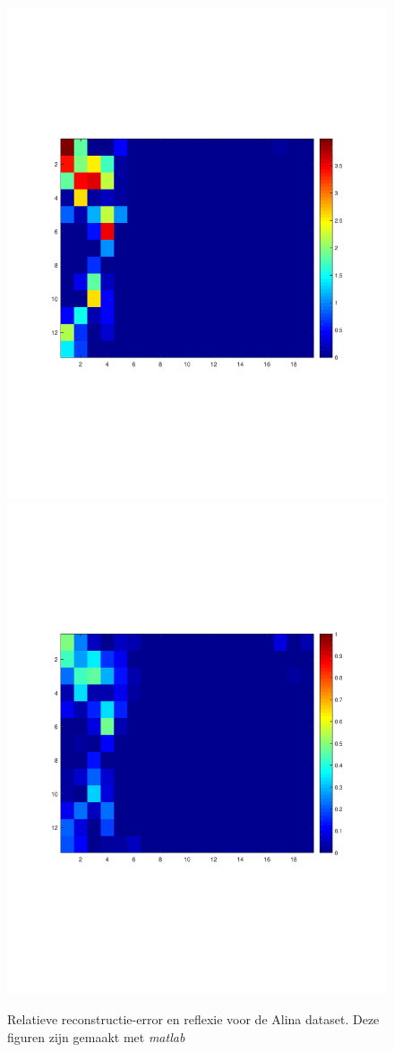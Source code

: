 \documentclass[12pt]{report}
\begin{document}
\begin{figure}
\includegraphics[width=0.49\linewidth,trim=0 200 0 175 cm]{Relative_Error.pdf}
\includegraphics[width=0.49\linewidth,trim=0 200 0 175 cm]{P.pdf}
\caption{Relatieve reconstructie-error en reflexie voor de Alina dataset. Deze figuren zijn gemaakt met \textit{matlab}\cite{MATLAB} \label{fig:q}}
\end{figure}
\end{document}
